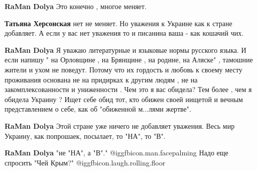 \begin{itemize}
\begin{itemize}
\textbf{RaMan Dolya} Это конечно , многое меняет.

 
\textbf{Татьяна Херсонская} нет не меняет. Но уважения к Украине как к стране добавляет. А если у вас нет уважения то и писанина ваша - как кошачий чих.

 
\textbf{RaMan Dolya} Я уважаю литературные и языковые нормы русского языка. И если напишу " на Орловщине , на Брянщине , на родине, на Аляске" , тамошние жители и ухом не поведут. Потому что их гордость и любовь к своему месту проживания основана не на придирках к другим людям , не на закомплексованности и униженности . Чем это я вас обидела? Тем более , чем я обидела Украину ? Ищет себе обид тот, кто обижен своей нищетой и вечным представлением о себе, как об "обиженной м...лями жертве".

 
\textbf{RaMan Dolya} Этой стране уже ничего не добавляет уважения. Весь мир Украину, как попрошаек, посылает, то "НА", то "В".

 
\textbf{RaMan Dolya} "не "НА", а "В"."  @igg{fbicon.man.facepalming}  Надо еще спросить "Чей Крым?"  @igg{fbicon.laugh.rolling.floor} 

 

\end{itemize}
\end{itemize}
